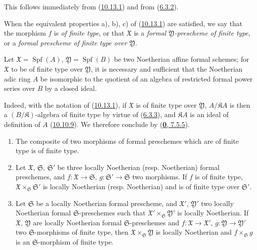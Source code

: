This follows immediately from (\hyperref[I.10.13.1]{10.13.1}) and from
(\hyperref[I.6.3.2]{6.3.2}).

\begin{definition}[10.13.3]
\label{I.10.13.3}
When the equivalent properties \textup{a), b), c)} of
(\hyperref[I.10.13.1]{10.13.1}) are satisfied, we say that the morphism
$f$ is \emph{of finite type}, or that $\mathfrak{X}$ is a
\emph{formal $\mathfrak{Y}$-prescheme of finite type}, or a
\emph{formal prescheme of finite type over $\mathfrak{Y}$}.
\end{definition}

\begin{corollary}[10.13.4]
\label{I.10.13.4}
Let $\mathfrak{X}=\operatorname{Spf}(A)$,
$\mathfrak{Y}=\operatorname{Spf}(B)$ be two Noetherian affine formal
schemes; for $\mathfrak{X}$ to be of finite type over
$\mathfrak{Y}$, it is necessary and sufficient that the Noetherian adic ring
$A$ be isomorphic to the quotient of an algebra of restricted formal power
series over $B$ by a closed ideal.
\end{corollary}

Indeed, with the notation of (\hyperref[I.10.13.1]{10.13.1}), if
$\mathfrak{X}$ is of finite type over $\mathfrak{Y}$,
$A/\mathfrak{K}A$ is then a $(B/\mathfrak{K})$-algebra of finite type by
virtue of (\hyperref[I.6.3.3]{6.3.3}), and $\mathfrak{K}A$ is an ideal of
definition of $A$ (\hyperref[I.10.10.9]{10.10.9}). We therefore conclude
by (\hyperref[0.7.5.5]{\textbf{0}, 7.5.5}).

\begin{proposition}[10.13.5]
\label{I.10.13.5}
\medskip\noindent
\begin{enumerate}
  \item[\rm{(i)}] The composite of two morphisms of formal preschemes which
    are of finite type is of finite type.


  \item[\rm{(ii)}] Let $\mathfrak{X}$, $\mathfrak{S}$,
    $\mathfrak{S}'$ be three locally Noetherian \textup{(resp.}
    Noetherian\textup{)} formal preschemes, and $f:\mathfrak{X}\to\mathfrak{S}$,
    $g:\mathfrak{S}'\to\mathfrak{S}$ two morphisms. If $f$ is of finite
    type, $\mathfrak{X}\times_{\mathfrak{S}}\mathfrak{S}'$ is locally
    Noetherian \textup{(resp.} Noetherian\textup{)} and is of finite type over $\mathfrak{S}'$.
  \item[\rm{(iii)}] Let $\mathfrak{S}$ be a locally Noetherian formal
    prescheme, and $\mathfrak{X}'$, $\mathfrak{Y}'$ two locally Noetherian
    formal $\mathfrak{S}$-preschemes such that
    $\mathfrak{X}'\times_{\mathfrak{S}}\mathfrak{Y}'$ is locally
    Noetherian. If $\mathfrak{X}$, $\mathfrak{Y}$ are locally Noetherian
    formal $\mathfrak{S}$-preschemes and
    $f:\mathfrak{X}\to\mathfrak{X}'$,
    $g:\mathfrak{Y}\to\mathfrak{Y}'$ two $\mathfrak{S}$-morphisms of
    finite type, then $\mathfrak{X}\times_{\mathfrak{S}}\mathfrak{Y}$ is
    locally Noetherian and $f\times_{\mathfrak{S}}g$ is an
    $\mathfrak{S}$-morphism of finite type.
\end{enumerate}
\end{proposition}

